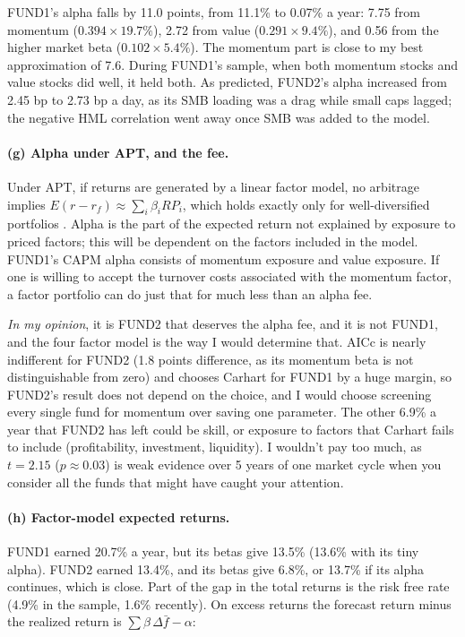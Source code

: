 \documentclass[11pt]{article}
\newcommand{\tbl}[1]{}
\begin{document}
\begin{table}[H]
\centering\small
\caption{CAPM alpha minus Carhart alpha, split by factor.}
\tbl{p5_alpha_decomp}
\end{table}

FUND1's alpha falls by 11.0 points, from 11.1\% to 0.07\% a year: 7.75 from momentum ($0.394\times19.7\%$), 2.72 from value ($0.291\times9.4\%$), and 0.56 from the higher market beta ($0.102\times5.4\%$). The momentum part is close to my best approximation of 7.6. During FUND1's sample, when both momentum stocks and value stocks did well, it held both. As predicted, FUND2's alpha increased from 2.45 bp to 2.73 bp a day, as its SMB loading was a drag while small caps lagged; the negative HML correlation went away once SMB was added to the model.

\paragraph{(g) Alpha under APT, and the fee.} Under APT, if returns are generated by a linear factor model, no arbitrage implies $E(r-r_f)\approx\sum_i\beta_i RP_i$, which holds exactly only for well-diversified portfolios \citep{ross1976arbitrage}. Alpha is the part of the expected return not explained by exposure to priced factors; this will be dependent on the factors included in the model. FUND1's CAPM alpha consists of momentum exposure and value exposure. If one is willing to accept the turnover costs associated with the momentum factor, a factor portfolio can do just that for much less than an alpha fee.

\emph{In my opinion}, it is FUND2 that deserves the alpha fee, and it is not FUND1, and the four factor model is the way I would determine that. AICc is nearly indifferent for FUND2 (1.8 points difference, as its momentum beta is not distinguishable from zero) and chooses Carhart for FUND1 by a huge margin, so FUND2's result does not depend on the choice, and I would choose screening every single fund for momentum over saving one parameter. The other 6.9\% a year that FUND2 has left could be skill, or exposure to factors that Carhart fails to include (profitability, investment, liquidity). I wouldn't pay too much, as $t=2.15$ ($p\approx0.03$) is weak evidence over 5 years of one market cycle when you consider all the funds that might have caught your attention.

\paragraph{(h) Factor-model expected returns.} FUND1 earned 20.7\% a year, but its betas give 13.5\% (13.6\% with its tiny alpha). FUND2 earned 13.4\%, and its betas give 6.8\%, or 13.7\% if its alpha continues, which is close. Part of the gap in the total returns is the risk free rate (4.9\% in the sample, 1.6\% recently). On excess returns the forecast return minus the realized return is $\sum\beta\,\Delta\bar f-\alpha$:
\end{document}
